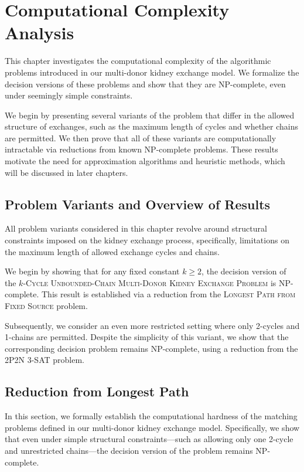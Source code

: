 \chapter{Computational Complexity Analysis}
\label{cha:computational_complexity_analysis}

This chapter investigates the computational complexity of the algorithmic problems introduced in our multi-donor kidney exchange model. We formalize the decision versions of these problems and show that they are NP-complete, even under seemingly simple constraints.

We begin by presenting several variants of the problem that differ in the allowed structure of exchanges, such as the maximum length of cycles and whether chains are permitted. We then prove that all of these variants are computationally intractable via reductions from known NP-complete problems. These results motivate the need for approximation algorithms and heuristic methods, which will be discussed in later chapters.

\section{Problem Variants and Overview of Results}

All problem variants considered in this chapter revolve around structural constraints imposed on the kidney exchange process, specifically, limitations on the maximum length of allowed exchange cycles and chains.

We begin by showing that for any fixed constant $k \ge 2$, the decision version of the \textsc{$k$-Cycle Unbounded-Chain Multi-Donor Kidney Exchange Problem} is NP-complete. This result is established via a reduction from the \textsc{Longest Path from Fixed Source} problem.

Subsequently, we consider an even more restricted setting where only 2-cycles and 1-chains are permitted. Despite the simplicity of this variant, we show that the corresponding decision problem remains NP-complete, using a reduction from the \textsc{2P2N 3-SAT} problem.



\section{Reduction from Longest Path}

In this section, we formally establish the computational hardness of the matching problems defined in our multi-donor kidney exchange model. Specifically, we show that even under simple structural constraints—such as allowing only one 2-cycle and unrestricted chains—the decision version of the problem remains NP-complete. 

